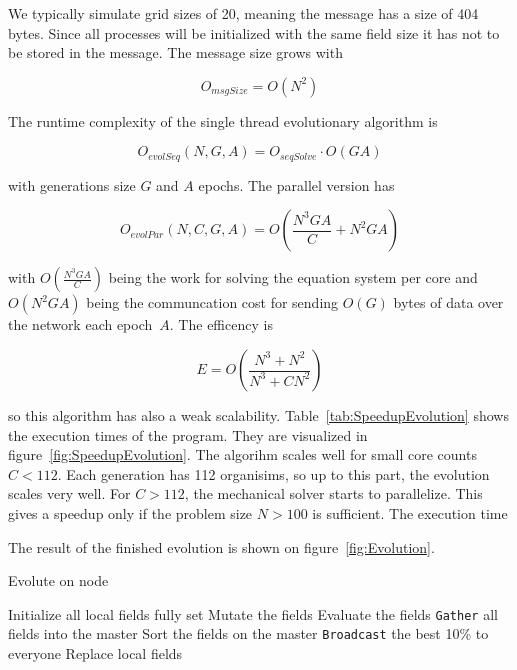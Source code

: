 \documentclass[12pt]{article}
\begin{document}
We typically simulate grid sizes of 20, meaning the message has a size of 404 bytes. Since all processes will be initialized with the same field size it has not to be stored in the message. The message size grows with 

\begin{equation}
    O_{msgSize} = O(N^2)
\end{equation}

The runtime complexity of the single thread evolutionary algorithm is

\begin{equation}
    O_\mathit{evolSeq}(N, G, A) = O_\textit{seqSolve} \cdot O(G A)
\end{equation}

with generations size $G$ and $A$ epochs. The parallel version has

\begin{equation}
    O_\mathit{evolPar}(N, C, G, A) = O \left( \frac{N^3 G A}{C} + N^2 G A\right)
\end{equation}

with $O (\frac{N^3 G A}{C} )$ being the work for solving the equation system per core and $O(N^2 G A)$ being the communcation cost for sending $O(G)$ bytes of data over the network each epoch~$A$. The efficency is

\begin{equation}
    E = O \left(\frac{N^3 + N^2}{N^3+C N^2}\right)
\end{equation}

so this algorithm has also a weak scalability. Table~\ref{tab:SpeedupEvolution} shows the execution times of the program. They are visualized in figure~\ref{fig:SpeedupEvolution}. The algorihm scales well for small core counts $C < 112$. Each generation has 112 organisims, so up to this part, the evolution scales very well. For $C > 112$, the mechanical solver starts to parallelize. This gives a speedup only if the problem size $N > 100$ is sufficient. The execution time 


The result of the finished evolution is shown on figure~\ref{fig:Evolution}.


\begin{algorithm}[p]
    \caption{Evolute on node}
    \begin{algorithmic}
        \STATE Initialize all local fields fully set
            \STATE Mutate the fields
            \STATE Evaluate the fields
            \STATE \texttt{Gather} all fields into the master
            \STATE Sort the fields on the master
            \STATE \texttt{Broadcast} the best 10\% to everyone
            \STATE Replace local fields
        \ENDFOR
    \end{algorithmic}
    \label{alg:Evolution}
\end{algorithm}
\end{document}
